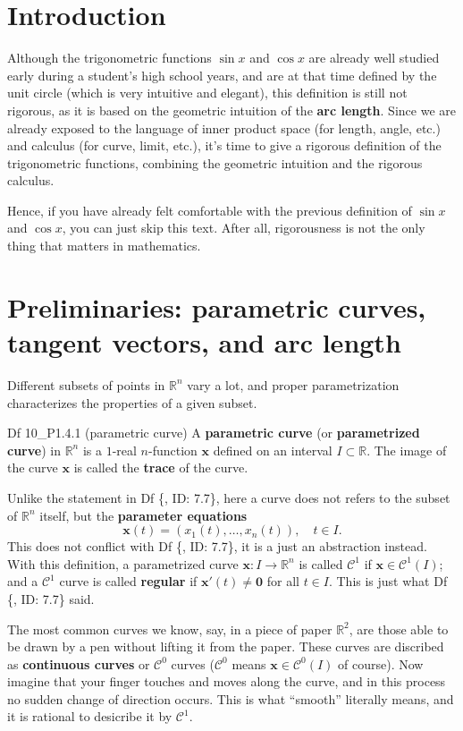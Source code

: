 \documentclass{article}
\begin{document}
\section{Introduction}
Although the trigonometric functions $\sin x$ and $\cos x$ are already well studied early during a student's high school years, and are at that time defined by the unit circle (which is very intuitive and elegant), this definition is still not rigorous, as it is based on the geometric intuition of the \textbf{arc length}. Since we are already exposed to the language of inner product space (for length, angle, etc.) and calculus (for curve, limit, etc.), it's time to give a rigorous definition of the trigonometric functions, combining the geometric intuition and the rigorous calculus.

Hence, if you have already felt comfortable with the previous definition of $\sin x$ and $\cos x$, you can just skip this text. After all, rigorousness is not the only thing that matters in mathematics. 

\section{Preliminaries: parametric curves, tangent vectors, and arc length}
Different subsets of points in $\mathbb{R}^n$ vary a lot, and proper parametrization characterizes the properties of a given subset. 

\begin{Df}{Df 10\_P1.4.1 (parametric curve)}
    A \textbf{parametric curve} (or \textbf{parametrized curve}) in $\mathbb{R}^n$ is a $1$-real $n$-function $\pmb{x}$ defined on an interval $I\subset \mathbb{R}$. The image of the curve $\pmb{x}$ is called the \textbf{trace} of the curve.
\end{Df}

Unlike the statement in Df \{, ID: 7.7\}, here a curve does not refers to the subset of $\mathbb{R}^n$ itself, but the \textbf{parameter equations} 
$$ \pmb{x}(t) = (x_1(t), \dots, x_n(t)), \quad t\in I. $$
This does not conflict with Df \{, ID: 7.7\}, it is a just an abstraction instead. With this definition, a parametrized curve $\pmb{x}: I\rightarrow \mathbb{R}^n$ is called $\mathcal{C}^1$ if $\pmb{x}\in \mathcal{C}^1(I)$; and a $\mathcal{C}^1$ curve is called \textbf{regular} if $\pmb{x}'(t)\neq \pmb{0}$ for all $t\in I$. This is just what Df \{, ID: 7.7\} said.

The most common curves we know, say, in a piece of paper $\mathbb{R}^2$, are those able to be drawn by a pen without lifting it from the paper. \textcolor{Df}{These curves are discribed as \textbf{continuous curves} or $\mathcal{C}^{0}$ curves ($\mathcal{C}^0$ means $\pmb{x}\in \mathcal{C}^0(I)$ of course)}. Now imagine that your finger touches and moves along the curve, and in this process no sudden change of direction occurs. This is what ``smooth'' literally means, and it is rational to desicribe it by $\mathcal{C}^1$. 
\end{document}
